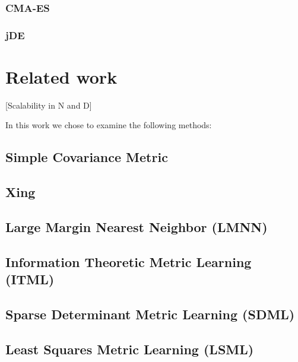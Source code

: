 \documentclass[12pt,a4paper]{report}
\begin{document}
\subsection{CMA-ES} \label{chap:ea:cmaes}
\subsection{jDE} \label{chap:ea:jde}


\chapter{Related work} \label{chap:rw}

[Scalability in N and D] %

In this work we chose to examine the following methods:

\section{Simple Covariance Metric} \label{chap:rw:cov}
\cite{mahalanobis1936generalized}

\section{Xing} \label{chap:rw:xing}
\cite{xing2002distance}

\section{Large Margin Nearest Neighbor (LMNN)} \label{chap:rw:lmnn}
\cite{weinberger2009distance}

\section{Information Theoretic Metric Learning (ITML)} \label{chap:rw:itml}
\cite{davis2007information}

\section{Sparse Determinant Metric Learning (SDML)} \label{chap:rw:sdml}
\cite{qi2009efficient}

\section{Least Squares Metric Learning (LSML)} \label{chap:rw:lsml}
\cite{liu2012metric}
\end{document}
